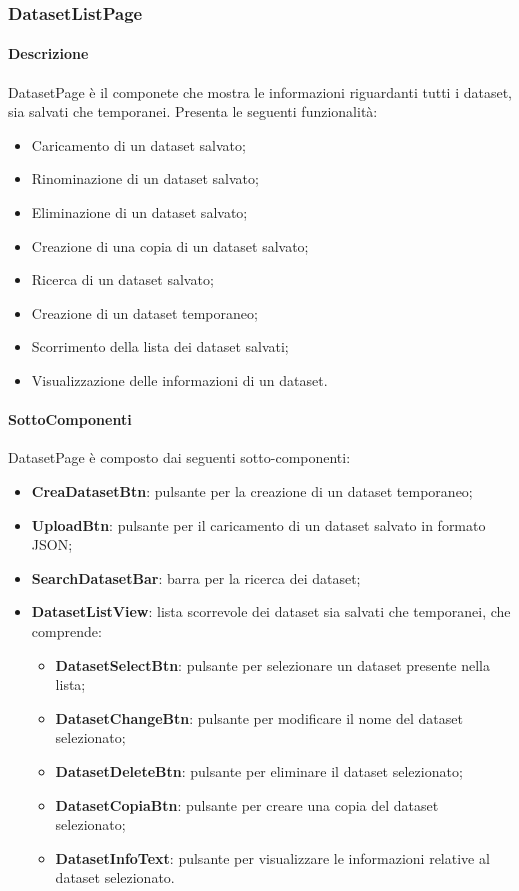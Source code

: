 \subsubsection{DatasetListPage}
\label{sec:DatasetListPage}
\paragraph{Descrizione}
DatasetPage è il componete che mostra le informazioni riguardanti tutti i dataset, sia salvati che temporanei. Presenta le seguenti funzionalità:
\begin{itemize}
    \item Caricamento di un dataset salvato;
    \item Rinominazione di un dataset salvato;
    \item Eliminazione di un dataset salvato;
    \item Creazione di una copia di un dataset salvato;
    \item Ricerca di un dataset salvato;
    \item Creazione di un dataset temporaneo;
    \item Scorrimento della lista dei dataset salvati;
    \item Visualizzazione delle informazioni di un dataset.
\end{itemize}
\paragraph{SottoComponenti}
DatasetPage è composto dai seguenti sotto-componenti:
\begin{itemize}
    \item \textbf{CreaDatasetBtn}: pulsante per la creazione di un dataset temporaneo;
    \item \textbf{UploadBtn}: pulsante per il caricamento di un dataset salvato in formato JSON;
    \item \textbf{SearchDatasetBar}: barra per la ricerca dei dataset;
    \item \textbf{DatasetListView}: lista scorrevole dei dataset sia salvati che temporanei, che comprende:
    \begin{itemize}
        \item \textbf{DatasetSelectBtn}: pulsante per selezionare un dataset presente nella lista;
        \item \textbf{DatasetChangeBtn}: pulsante per modificare il nome del dataset selezionato;
        \item \textbf{DatasetDeleteBtn}: pulsante per eliminare il dataset selezionato;
        \item \textbf{DatasetCopiaBtn}: pulsante per creare una copia del dataset selezionato;
        \item \textbf{DatasetInfoText}: pulsante per visualizzare le informazioni relative al dataset selezionato.
    \end{itemize}
\end{itemize}

